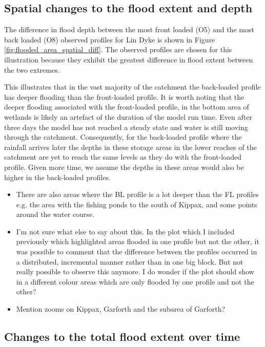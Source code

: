 \documentclass[APA,Times2COL]{WileyNJDv5}
\begin{document}
\subsection{Spatial changes to the flood extent and depth}\label{subsec:model}
The difference in flood depth between the most front loaded (O5) and the most back loaded (O8) observed profiles for Lin Dyke is shown in Figure \ref{fig:flooded_area_spatial_diff}. The observed profiles are chosen for this illustration because they exhibit the greatest difference in flood extent between the two extremes. 

This illustrates that in the vast majority of the catchment the back-loaded profile has deeper flooding than the front-loaded profile. It is worth noting that the deeper flooding associated with the front-loaded profile, in the bottom area of wetlands is likely an artefact of the duration of the model run time. Even after three days the model has not reached a steady state and water is still moving through the catchment. Consequently, for the back-loaded profile where the rainfall arrives later the depths in these storage areas in the lower reaches of the catchment are yet to reach the same levels as they do with the front-loaded profile. Given more time, we assume the depths in these areas would also be higher in the back-loaded profiles. 

\begin{itemize}

    \item There are also areas where the BL profile is a lot deeper than the FL profiles e.g. the area with the fishing ponds to the south of Kippax, and some points around the water course. 
    \item I'm not sure what else to say about this. In the plot which I included previously which highlighted areas flooded in one profile but not the other, it was possible to comment that the difference between the profiles occurred in a distributed, incremental manner rather than in one big block. But not really possible to observe this anymore. I do wonder if the plot should show in a different colour areas which are only flooded by one profile and not the other?  
    \item Mention zooms on Kippax, Garforth and the subarea of Garforth? 
\end{itemize}

\subsection{Changes to the total flood extent over time}\label{subsec:flood_over_time}
\end{document}

